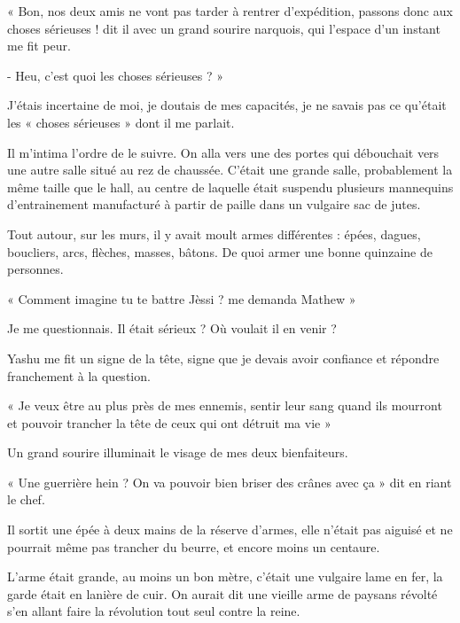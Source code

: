 \documentclass{book}
\begin{document}
« Bon, nos deux amis ne vont pas tarder à rentrer d'expédition, passons donc aux choses sérieuses ! dit il avec un grand sourire narquois, qui l'espace d'un instant me fit peur.

- Heu, c'est quoi les choses sérieuses ? »\newline

J'étais incertaine de moi, je doutais de mes capacités, je ne savais pas ce qu'était les « choses sérieuses » dont il me parlait.\newline

Il m'intima l'ordre de le suivre. On alla vers une des portes qui débouchait vers une autre salle situé au rez de chaussée. C'était une grande salle, probablement la même taille que le hall, au centre de laquelle était suspendu plusieurs mannequins d'entrainement manufacturé à partir de paille dans un vulgaire sac de jutes.\newline

Tout autour, sur les murs, il y avait moult armes différentes : épées, dagues, boucliers, arcs, flèches, masses, bâtons. De quoi armer une bonne quinzaine de personnes.\newline

« Comment imagine tu te battre Jèssi ? me demanda Mathew »

Je me questionnais. Il était sérieux ? Où voulait il en venir ?

Yashu me fit un signe de la tête, signe que je devais avoir confiance et répondre franchement à la question.

« Je veux être au plus près de mes ennemis, sentir leur sang quand ils mourront et pouvoir trancher la tête de ceux qui ont détruit ma vie »

Un grand sourire illuminait le visage de mes deux bienfaiteurs.

« Une guerrière hein ? On va pouvoir bien briser des crânes avec ça » dit en riant le chef.\newline

Il sortit une épée à deux mains de la réserve d'armes, elle n'était pas aiguisé et ne pourrait même pas trancher du beurre, et encore moins un centaure.\newline

L'arme était grande, au moins un bon mètre, c'était une vulgaire lame en fer, la garde était en lanière de cuir. On aurait dit une vieille arme de paysans révolté s'en allant faire la révolution tout seul contre la reine.\newline
\end{document}
